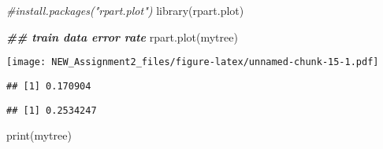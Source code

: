 \documentclass[
]{article}
\newenvironment{Shaded}{\begin{snugshade}}{\end{snugshade}}
\newcommand{\AttributeTok}[1]{\textcolor[rgb]{0.77,0.63,0.00}{#1}}
\newcommand{\CommentTok}[1]{\textcolor[rgb]{0.56,0.35,0.01}{\textit{#1}}}
\newcommand{\DocumentationTok}[1]{\textcolor[rgb]{0.56,0.35,0.01}{\textbf{\textit{#1}}}}
\newcommand{\FunctionTok}[1]{\textcolor[rgb]{0.00,0.00,0.00}{#1}}
\newcommand{\NormalTok}[1]{#1}
\newcommand{\OtherTok}[1]{\textcolor[rgb]{0.56,0.35,0.01}{#1}}
\newcommand{\SpecialCharTok}[1]{\textcolor[rgb]{0.00,0.00,0.00}{#1}}
\newcommand{\StringTok}[1]{\textcolor[rgb]{0.31,0.60,0.02}{#1}}
\begin{document}
\begin{Shaded}
\begin{Highlighting}[]
\CommentTok{\#install.packages("rpart.plot")}
\FunctionTok{library}\NormalTok{(rpart.plot)}

\DocumentationTok{\#\# train data error rate}
\FunctionTok{rpart.plot}\NormalTok{(mytree)}
\end{Highlighting}
\end{Shaded}

\texttt{[image: NEW\_Assignment2\_files/figure-latex/unnamed-chunk-15-1.pdf]}

\begin{Shaded}
\end{Shaded}

\begin{verbatim}
## [1] 0.170904
\end{verbatim}

\begin{Shaded}
\end{Shaded}

\begin{verbatim}
## [1] 0.2534247
\end{verbatim}

\begin{Shaded}
\begin{Highlighting}[]
\FunctionTok{print}\NormalTok{(mytree)}
\end{Highlighting}
\end{Shaded}
\end{document}
